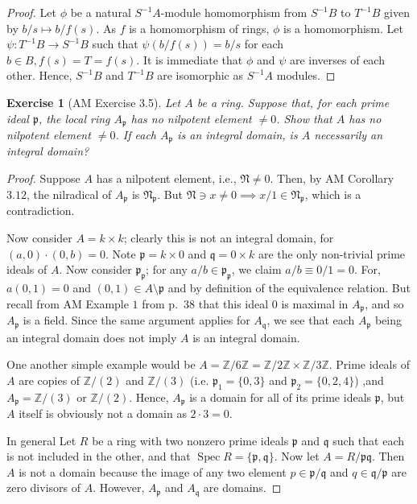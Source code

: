\documentclass[12pt,letterpaper]{article}
\newtheorem{problem}{Exercise}[section]
\theoremstyle{definition}
\theoremstyle{remark}
\numberwithin{figure}{problem}
\numberwithin{equation}{section}
\DeclareMathOperator{\Spec}{Spec}
\begin{document}
\begin{proof}
Let $\phi$ be a natural $S^{-1}A$-module homomorphism from $S^{-1}B$ to $T^{-1}B$ given by $b/s \mapsto b/f(s)$. As $f$ is a homomorphism of rings, $\phi$ is a homomorphism. Let $\psi: T^{-1}B\to S^{-1}B$ such that $\psi(b/f(s)) = b/s$ for each $b \in B, f(s) = T = f(s)$. It is immediate that $\phi$ and $\psi$ are inverses of each other. Hence, $S^{-1}B$ and $T^{-1}B$ are isomorphic as $S^{-1}A$ modules. 
\end{proof}

\begin{problem}[AM Exercise 3.5]
  Let $A$ be a ring. Suppose that, for each prime ideal $\mathfrak{p}$, the local ring $A_\mathfrak{p}$ has no nilpotent element $\ne 0$. Show that $A$ has no nilpotent element $\ne 0$. If each $A_\mathfrak{p}$ is an integral domain, is $A$ necessarily an integral domain?
\end{problem}
\begin{proof}
  Suppose $A$ has a nilpotent element, i.e., $\mathfrak{N} \ne 0$. Then, by AM Corollary $3.12$, the nilradical of $A_\mathfrak{p}$ is $\mathfrak{N}_\mathfrak{p}$. But $\mathfrak{N} \ni x \ne 0 \implies x/1 \in \mathfrak{N}_\mathfrak{p}$, which is a contradiction.
  \par Now consider $A = k \times k$; clearly this is not an integral domain, for $(a,0)\cdot(0,b) = 0$. Note $\mathfrak{p} = k \times 0$ and $\mathfrak{q} = 0 \times k$ are the only non-trivial prime ideals of $A$. Now consider $\mathfrak{p}_\mathfrak{p}$; for any $a/b \in \mathfrak{p}_\mathfrak{p}$, we claim $a/b \equiv 0/1 = 0$. For, $a(0,1) = 0$ and $(0,1) \in A \setminus \mathfrak{p}$ and by definition of the equivalence relation. But recall from AM Example $1$ from p.~$38$ that this ideal $0$ is maximal in $A_\mathfrak{p}$, and so $A_\mathfrak{p}$ is a field. Since the same argument applies for $A_\mathfrak{q}$, we see that each $A_\mathfrak{p}$ being an integral domain does not imply $A$ is an integral domain.
  \par One another simple example would be $A = \mathbb{Z}/6\mathbb{Z} = \mathbb{Z}/2\mathbb{Z} \times \mathbb{Z}/3\mathbb{Z}$. Prime ideals of $A$ are copies of $\mathbb{Z}/(2)$ and $ \mathbb{Z}/(3)$ (i.e. $\mathfrak{p}_1 = \{0,3\}$ and $ \mathfrak{p}_2 = \{0,2,4\}$) ,and $A_{\mathfrak{p}} = \mathbb{Z}/(3)$ or $\mathbb{Z}/(2)$. Hence, $A_\mathfrak{p}$ is a domain for all of its prime ideals $\mathfrak{p}$, but $A$ itself is obviously not a domain as $2 \cdot 3 = 0$. 
  \par In general Let $R$ be a ring with two nonzero prime ideals $\mathfrak{p}$ and $\mathfrak{q}$ such that each is not included in the other, and that $\Spec R = \{\mathfrak{p}, \mathfrak{q}\}.$ Now let $A = R/\mathfrak{p}\mathfrak{q}$. Then $A$ is not a domain because the image of any two element $p \in \mathfrak{p}/\mathfrak{q}$ and $q \in \mathfrak{q}/\mathfrak{p}$ are zero divisors of $A$. However, $A_{\mathfrak{p}}$ and  $A_{\mathfrak{q}}$ are domains. 
\end{proof}
\end{document}
